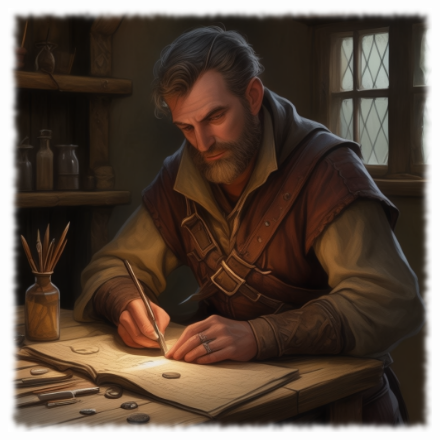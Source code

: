 \begin{figure}%
\begin{center}
\includegraphics[scale=0.22]{img/ai-images/human-merchant.png}
\end{center}
\end{figure}

